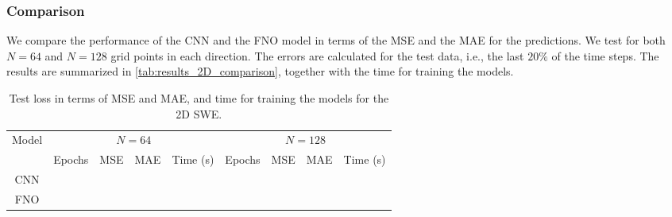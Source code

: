 \subsubsection*{Comparison}
We compare the performance of the CNN and the FNO model in terms of the MSE and the MAE for the predictions.
We test for both $N = 64$ and $N = 128$ grid points in each direction.
The errors are calculated for the test data, i.e., the last $20\%$ of the time steps.
The results are summarized in \autoref{tab:results_2D_comparison}, together with the time for training the models.
\begin{table}[H]
    \centering
    \small %
    \begin{tabular}{c|cccc|cccc}
        Model & \multicolumn{4}{c|}{$N = 64$} & \multicolumn{4}{c}{$N = 128$} \\
        \cline{2-9}
        & Epochs & MSE & MAE & Time (s) & Epochs & MSE & MAE & Time (s) \\
        \hline
        CNN  &
         &
         & 
         &
         &
         &
         &
         &
         
        \\
        \hline
        FNO  &
         &
         &
         &
         &
         &
         &
         &
        
        \\
        \hline
    \end{tabular}
    \caption{Test loss in terms of MSE and MAE, and time for training the models for the 2D SWE.}\label{tab:results_2D_comparison}
\end{table}
